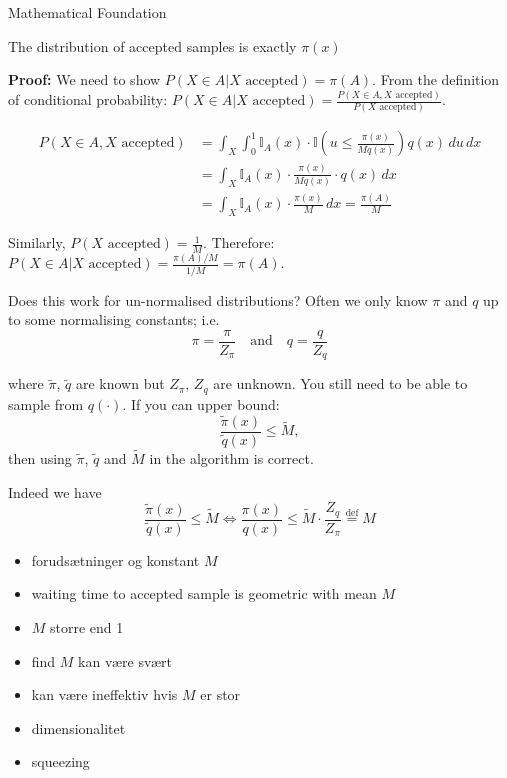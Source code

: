 \documentclass[aspectratio=169]{beamer}
\begin{document}
\begin{frame}{Mathematical Foundation}
    \begin{proposition}
        The distribution of accepted samples is exactly $\pi(x)$
    \end{proposition}
\textbf{Proof:} We need to show $P(X \in A | X \text{ accepted}) = \pi(A)$. From the 
definition of conditional probability: $P(X \in A | X \text{ accepted}) = \frac{P(X \in A, X \text{ accepted})}{P(X \text{ accepted})}$.

\begin{align*}
P(X \in A, X \text{ accepted}) &= \int_X \int_0^1 \mathbb{I}_A(x) \cdot \mathbb{I}\left(u \leq \frac{\pi(x)}{M q(x)}\right) q(x) \, du \, dx \\
&= \int_X \mathbb{I}_A(x) \cdot \frac{\pi(x)}{M q(x)} \cdot q(x) \, dx \\
&= \int_X \mathbb{I}_A(x) \cdot \frac{\pi(x)}{M} \, dx = \frac{\pi(A)}{M}
\end{align*}

Similarly, $P(X \text{ accepted}) = \frac{1}{M}$. Therefore: $P(X \in A | X \text{ accepted}) = \frac{\pi(A)/M}{1/M} = \pi(A)$.

\end{frame}

\begin{frame}{Does this work for un-normalised distributions?}
    Often we only know $\pi$ and $q$ up to some normalising constants; i.e.
\begin{equation*}
 \pi = \frac{\pi}{Z_\pi} \quad \text{and} \quad q = \frac{q}{Z_q}
\end{equation*}

where $\tilde{\pi}$, $\tilde{q}$ are known but $Z_\pi$, $Z_q$ are unknown. 
You still need to be able to sample from $q(\cdot)$. 
If you can upper bound:
\begin{equation*}
\frac{\tilde{\pi}(x)}{\tilde{q}(x)} \leq \tilde{M},
\end{equation*}
then using $\tilde{\pi}$, $\tilde{q}$ and $\tilde{M}$ in the algorithm is correct.


Indeed we have
\begin{equation*}
\frac{\tilde{\pi}(x)} {\tilde{q}(x)} \leq \tilde{M} \iff 
\frac{\pi(x)}{q(x)} \leq \tilde{M} \cdot \frac{Z_q}{Z_\pi} \overset{\text{def}}{=} M
\end{equation*}

\end{frame}

\begin{frame}
    \begin{itemize}
        \item forudsætninger og konstant $M$
        \item waiting time to accepted sample is geometric with mean $M$
        \item $M$ storre end 1
        \item find $M$ kan være svært
        \item kan være ineffektiv hvis $M$ er stor
        \item dimensionalitet 
        \item squeezing
    \end{itemize} 
\end{frame}
\end{document}
